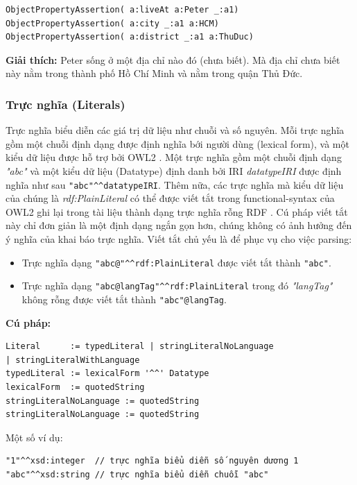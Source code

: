 \begin{verbatim}
ObjectPropertyAssertion( a:liveAt a:Peter _:a1)
ObjectPropertyAssertion( a:city _:a1 a:HCM)
ObjectPropertyAssertion( a:district _:a1 a:ThuDuc)
\end{verbatim}

\textbf{Giải thích:} Peter sống ở một địa chỉ nào đó (chưa biết). Mà địa chỉ chưa biết này nằm trong thành phố Hồ Chí Minh và nằm trong quận Thủ Đức.

\subsubsection{Trực nghĩa (Literals)}
Trực nghĩa biểu diễn các giá trị dữ liệu như chuỗi và số nguyên. Mỗi trực nghĩa gồm một chuỗi định dạng được định nghĩa bới người dùng (lexical form), và một kiểu dữ liệu được hỗ trợ bởi OWL2 \cite{owl2spec} . Một trực nghĩa gồm một chuỗi định dạng \textit{"abc"} và một kiểu dữ liệu (Datatype) định danh bởi IRI \textit{datatypeIRI} được định nghĩa như sau \verb|"abc"^^datatypeIRI|. Thêm nữa, các trực nghĩa mà kiểu dữ liệu của chúng là \textit{rdf:PlainLiteral} có thể được viết tắt trong functional-syntax của OWL2 ghi lại trong tài liệu thành dạng trực nghĩa rỗng RDF \cite{rdf_concept}. Cú pháp viết tắt này chỉ đơn giản là một định dạng ngắn gọn hơn, chúng không có ảnh hưởng đến ý nghĩa của khai báo trực nghĩa. Viết tắt chủ yếu là để phục vụ cho việc parsing:
\begin{itemize}
\item Trực nghĩa dạng \verb|"abc@"^^rdf:PlainLiteral| được viết tắt thành \verb|"abc"|.
\item Trực nghĩa dạng \verb|"abc@langTag"^^rdf:PlainLiteral| trong đó \textit{"langTag"} không rỗng được viết tắt thành \verb|"abc"@langTag|.
\end{itemize}
\textbf{Cú pháp:}
\begin{verbatim}
Literal      := typedLiteral | stringLiteralNoLanguage 
| stringLiteralWithLanguage
typedLiteral := lexicalForm '^^' Datatype
lexicalForm  := quotedString
stringLiteralNoLanguage := quotedString
stringLiteralNoLanguage := quotedString
\end{verbatim}
Một số ví dụ:
\begin{verbatim}
"1"^^xsd:integer  // trực nghĩa biểu diễn số nguyên dương 1
"abc"^^xsd:string // trực nghĩa biểu diễn chuỗi "abc"
\end{verbatim}

